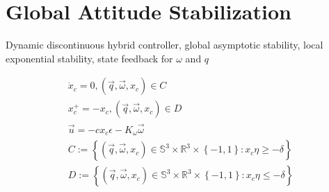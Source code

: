 \section{Global Attitude Stabilization}

Dynamic discontinuous hybrid controller, global asymptotic stability, local exponential stability, state feedback for $\omega$ and $q$

\[
\begin{array}{l}

\dot{x}_c = 0, (\vec{q},\vec{\omega},x_c) \in C\ \\ 
x_c^+ = -x_c, (\vec{q},\vec{\omega},x_c) \in D\ \\ 
\vec{u} = -c x_c \epsilon -K_\omega \vec{\omega} \\
C:= \left\lbrace (\vec{q},\vec{\omega},x_c) \in \mathbb{S}^3 \times \mathbb{R}^3 \times \left\lbrace -1,1 \right\rbrace : x_c\eta \geq -\delta \right\rbrace  \\

D:= \left\lbrace (\vec{q},\vec{\omega},x_c) \in \mathbb{S}^3 \times \mathbb{R}^3 \times \left\lbrace -1,1 \right\rbrace : x_c\eta \leq -\delta \right\rbrace 
\end{array}
\]